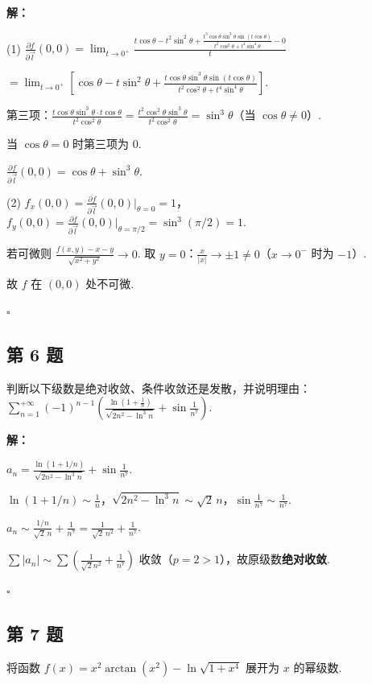 \documentclass[12pt,a4paper]{article}
\newenvironment{sol}[1][解]{%
  \par\medskip\noindent\textbf{#1：}\itshape\par\noindent\ignorespaces
}{%
  \par\hfill$\square$\par\medskip
}
\begin{document}
\begin{sol}(1) $\frac{\partial f}{\partial\vec{l}}(0,0)=\lim_{t\to
  0^+}\frac{t\cos\theta-t^2\sin^2\theta+\frac{t^3\cos\theta\sin^3\theta\sin(t\cos\theta)}{t^2\cos^2\theta+t^4\sin^4\theta}-0}{t}$

  $=\lim_{t\to
  0^+}\left[\cos\theta-t\sin^2\theta+\frac{t\cos\theta\sin^3\theta\sin(t\cos\theta)}{t^2\cos^2\theta+t^4\sin^4\theta}\right].$

  第三项：$\frac{t\cos\theta\sin^3\theta\cdot
  t\cos\theta}{t^2\cos^2\theta}=\frac{t^2\cos^2\theta\sin^3\theta}{t^2\cos^2\theta}=\sin^3\theta$（当
  $\cos\theta\ne 0$）.

  当 $\cos\theta=0$ 时第三项为 0.

  $\frac{\partial f}{\partial\vec{l}}(0,0)=\cos\theta+\sin^3\theta.$

  (2) $f_x(0,0)=\frac{\partial
  f}{\partial\vec{l}}(0,0)\Big|_{\theta=0}=1$，$f_y(0,0)=\frac{\partial
  f}{\partial\vec{l}}(0,0)\Big|_{\theta=\pi/2}=\sin^3(\pi/2)=1$.

  若可微则 $\frac{f(x,y)-x-y}{\sqrt{x^2+y^2}}\to 0$. 取
  $y=0$：$\frac{x}{|x|}\to\pm 1\ne 0$（$x\to 0^-$ 时为 $-1$）.

  故 $f$ 在 $(0,0)$ 处不可微.

\end{sol}
\subsection*{第 6 题}
判断以下级数是绝对收敛、条件收敛还是发散，并说明理由：$\sum_{n=1}^{+\infty}(-1)^{n-1}\left(\frac{\ln(1+\frac{1}{n})}{\sqrt{2n^2-\ln^3
n}}+\sin\frac{1}{n^7}\right)$.

\begin{sol}$a_n=\frac{\ln(1+1/n)}{\sqrt{2n^2-\ln^3
  n}}+\sin\frac{1}{n^7}$.

  $\ln(1+1/n)\sim\frac{1}{n}$，$\sqrt{2n^2-\ln^3
  n}\sim\sqrt{2}\,n$，$\sin\frac{1}{n^7}\sim\frac{1}{n^7}$.

  $a_n\sim\frac{1/n}{\sqrt{2}\,n}+\frac{1}{n^7}=\frac{1}{\sqrt{2}\,n^2}+\frac{1}{n^7}$.

  $\sum|a_n|\sim\sum(\frac{1}{\sqrt{2}n^2}+\frac{1}{n^7})$
  收敛（$p=2>1$），故原级数\textbf{绝对收敛}.

\end{sol}
\subsection*{第 7 题}
将函数 $f(x)=x^2\arctan(x^2)-\ln\sqrt{1+x^4}$ 展开为 $x$ 的幂级数.
\end{document}
